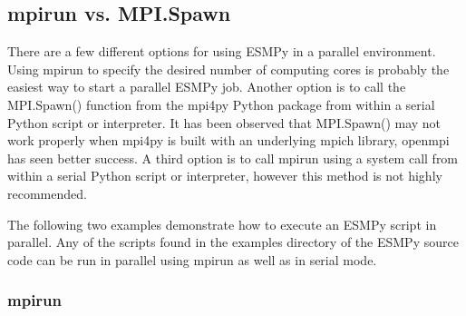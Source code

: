 \documentclass[letterpaper,10pt,english]{sphinxmanual}
\begin{document}
\subsection{mpirun vs. MPI.Spawn}
\label{\detokenize{api:mpirun-vs-mpi-spawn}}
There are a few different options for using ESMPy in a parallel
environment. Using mpirun to specify the desired number of computing cores
is probably the easiest way to start a parallel ESMPy job. Another option is to
call the MPI.Spawn() function from the mpi4py Python package from within a
serial Python script or interpreter. It has been observed that MPI.Spawn() may
not work properly when mpi4py is built with an underlying mpich
library, openmpi has seen better success. A third option is to call mpirun
using a system call from within a serial Python script or interpreter, however
this method is not highly recommended.

The following two examples demonstrate how to execute an ESMPy script in
parallel. Any of the scripts found in the examples directory of the ESMPy source
code can be run in parallel using mpirun as well as in serial mode.


\subsubsection{mpirun}
\label{\detokenize{api:mpirun}}
\begin{sphinxVerbatim}[commandchars=\\\{\}]
    
\end{sphinxVerbatim}
\end{document}
